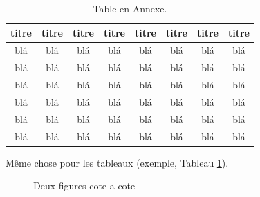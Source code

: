 \begin{table}
		\parbox{0.65\textwidth}{\caption{Table en Annexe.}\label{tab:testAp}}

		\begin{tabular}{|c|c|c|c|c|c|c|c|}
		\hline
			{\bf titre} & {\bf titre} & {\bf titre} & {\bf titre} & {\bf titre} & {\bf titre} & {\bf titre} & {\bf titre} \\
	  \hline
			blá & blá & blá & blá & blá & blá & blá & blá \\
	  \hline
			blá & blá & blá & blá & blá & blá & blá & blá \\
	  \hline
			blá & blá & blá & blá & blá & blá & blá & blá \\
	  \hline
			blá & blá & blá & blá & blá & blá & blá & blá \\
	  \hline
			blá & blá & blá & blá & blá & blá & blá & blá \\
	  \hline
			blá & blá & blá & blá & blá & blá & blá & blá \\
	  \hline
		\end{tabular}
\end{table}

Même chose pour les tableaux (exemple, Tableau \ref{tab:testAp}).

\begin{spacing}{0.8}
	\begin{figure}[!h]
		\begin{center}
			\hspace{1.5cm}%
			\hfill
			\caption{Deux figures cote a cote}%
			\label{comp01}
		\end{center}
	\end{figure}
\end{spacing}
